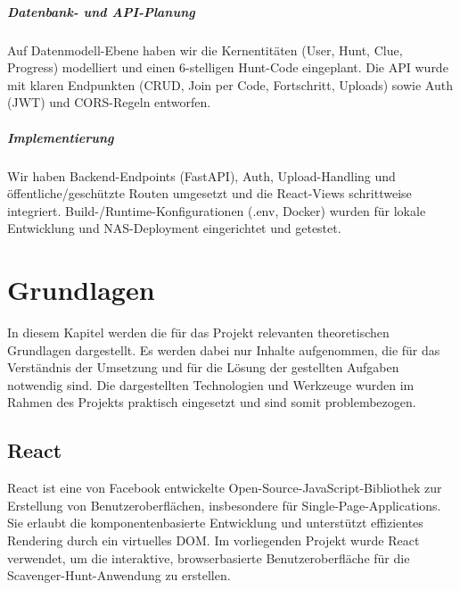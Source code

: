 \documentclass[oneside]{ausarbeitung}
\begin{document}
\paragraph{Datenbank- und API-Planung}
Auf Datenmodell-Ebene haben wir die Kernentitäten (User, Hunt, Clue, Progress) modelliert und einen 6-stelligen Hunt-Code eingeplant. Die API wurde mit klaren Endpunkten (CRUD, Join per Code, Fortschritt, Uploads) sowie Auth (JWT) und CORS-Regeln entworfen.

\paragraph{Implementierung}
Wir haben Backend-Endpoints (FastAPI), Auth, Upload-Handling und öffentliche/geschützte Routen umgesetzt und die React-Views schrittweise integriert. Build-/Runtime-Konfigurationen (.env, Docker) wurden für lokale Entwicklung und NAS-Deployment eingerichtet und getestet.



\chapter{Grundlagen}
\label{cha:grundlagen}

In diesem Kapitel werden die für das Projekt relevanten theoretischen Grundlagen dargestellt. 
Es werden dabei nur Inhalte aufgenommen, die für das Verständnis der Umsetzung und für die Lösung der gestellten Aufgaben notwendig sind. 
Die dargestellten Technologien und Werkzeuge wurden im Rahmen des Projekts praktisch eingesetzt und sind somit problembezogen.




\section{React}
\label{sec:react}
React ist eine von Facebook entwickelte Open-Source-JavaScript-Bibliothek zur Erstellung von Benutzeroberflächen, insbesondere für Single-Page-Applications\autocite{React:Official}. 
Sie erlaubt die komponentenbasierte Entwicklung und unterstützt effizientes Rendering durch ein virtuelles DOM. 
Im vorliegenden Projekt wurde React verwendet, um die interaktive, browserbasierte Benutzeroberfläche für die Scavenger-Hunt-Anwendung zu erstellen.
\end{document}
